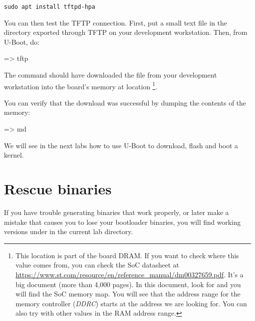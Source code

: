 \begin{verbatim}
sudo apt install tftpd-hpa
\end{verbatim}

You can then test the TFTP connection. First, put a small text file in
the directory exported through TFTP on your development
workstation. Then, from U-Boot, do:

\begin{ubootinput}
=> tftp %
\end{ubootinput}

The  command should have downloaded the
 file from your development workstation into
the board's memory at location {\tt \zimageboardaddr}\footnote{
This location is part of the board DRAM. If you want
to check where this value comes from, you can check the SoC
datasheet at
\url{https://www.st.com/resource/en/reference_manual/dm00327659.pdf}.
It's a big document (more than 4,000 pages). In this document, look
for  and you will find the SoC memory map.
You will see that the address range for the memory controller
({\em DDRC})
starts at the address we are looking for.
You can also try with other values in the RAM address range.}.

You can verify that the download was successful by dumping the
contents of the memory:

\begin{ubootinput}
=> md %
\end{ubootinput}

We will see in the next labs how to use U-Boot to download, flash and
boot a kernel.



\section{Rescue binaries}

If you have trouble generating binaries that work properly, or later
make a mistake that causes you to lose your bootloader binaries, you
will find working versions under  in the current lab
directory.
